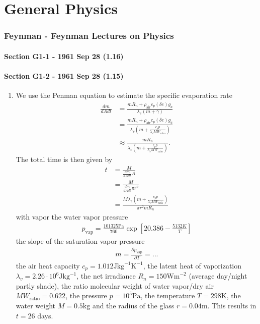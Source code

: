 \documentclass[10pt,a4paper]{book}
\theoremstyle{definition}
\begin{document}
\chapter{General Physics}

\subsection{{\sc Feynman} - Feynman Lectures on Physics}
\subsubsection{Section G1-1 - 1961 Sep 28 (1.16)}
\subsubsection{Section G1-2 - 1961 Sep 28 (1.15)}
\begin{enumerate}[label=(\alph*)]
\item  We use the Penman equation to estimate the specific evaporation rate
\begin{align}
    \frac{dm}{dA dt}
    &=\frac{m R_n + \rho_\text{air}c_p (\delta e)g_a}{\lambda_v(m+\gamma)}\\
    &=\frac{m R_n + \rho_\text{air}c_p (\delta e)g_a}{\lambda_v(m+\frac{c_p p}{\lambda_v MW_\text{ratio}})}\\
    &\approx\frac{m R_n}{\lambda_v(m+\frac{c_p p}{\lambda_v MW_\text{ratio}})}.
\end{align}
The total time is then given by
\begin{align}
    t&=\frac{M}{\frac{dm}{dA dt}A}\\
    &=\frac{M}{\frac{dm}{dA dt}\pi r^2}\\
    &=\frac{M\lambda_v(m+\frac{c_p p}{\lambda_v MW_\text{ratio}})}{\pi r^2 m R_n }
\end{align}
with vapor the water vapor pressure
\begin{align}
    p_\text{vap}=\frac{101325\text{Pa}}{760} \exp\left[20.386 - \frac{5132K}{T}\right]
\end{align}
the slope of the saturation vapor pressure
\begin{align}
    m=\frac{\partial p_\text{vap}}{\partial T}=...
\end{align}
the air heat capacity $c_p=1.012\text{J}\text{kg}^{-1}\text{K}^{-1}$, the latent heat of vaporization $\lambda_v=2.26\cdot10^6 \text{J}\text{kg}^{-1}$, the net irradiance $R_n=150\text{Wm}^{-2}$ (average day/night partly shade), the ratio molecular weight of water vapor/dry air $MW_\text{ratio}=0.622$, the pressure $p=10^5\text{Pa}$, the temperature $T= 298\text{K}$, the water weight $M=0.5\text{kg}$ and the radius of the glass $r=0.04\text{m}$. This results in $t=26$ days.


\end{enumerate}
\end{document}
